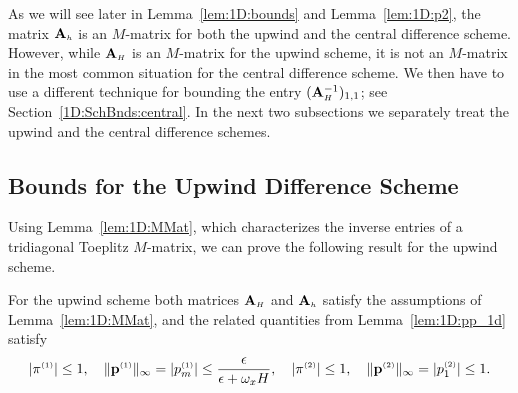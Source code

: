 As we will see later in Lemma~\ref{lem:1D:bounds} and Lemma~\ref{lem:1D:p2},
the matrix $\mathbf{A}_{\scriptscriptstyle h}$ is an $M$-matrix for both the upwind and the central
difference scheme. However, while $\mathbf{A}_{\scriptscriptstyle H}$ is an $M$-matrix for the upwind
scheme, it is not an $M$-matrix in the most common situation for the central
difference scheme. We then have to use a different technique for bounding the
entry $(\mathbf{A}_{\scriptscriptstyle H}^{-1})_{1,1}$; see Section~\ref{1D:SchBnds:central}. In the next
two subsections we separately treat the upwind and the central difference
schemes.

\subsection{Bounds for the Upwind Difference Scheme}
\label{1D:SchBnds:upwind}

Using Lemma~\ref{lem:1D:MMat}, which characterizes the inverse entries of a
tridiagonal Toeplitz $M$-matrix, we can prove the following result for the
upwind scheme.

\begin{lemma}\label{lem:1D:bounds}
For the upwind scheme both matrices $\mathbf{A}_{\scriptscriptstyle H}$ and $\mathbf{A}_{\scriptscriptstyle h}$ satisfy the
assumptions of Lemma~\ref{lem:1D:MMat}, and the related quantities from
Lemma~\ref{lem:1D:pp_1d} satisfy
%
$$|\pi^{\scriptscriptstyle (1)}|\leq 1, \quad \|\mathbf{p}^{\scriptscriptstyle (1)}\|_\infty =|p^{\scriptscriptstyle (1)}_m|\leq \frac{\epsilon}{\epsilon+\omega_x H},
\quad |\pi^{\scriptscriptstyle (2)}|\leq 1,\quad \|\mathbf{p}^{\scriptscriptstyle (2)}\|_\infty=|p^{\scriptscriptstyle (2)}_1|\leq 1.$$
%
\end{lemma}

